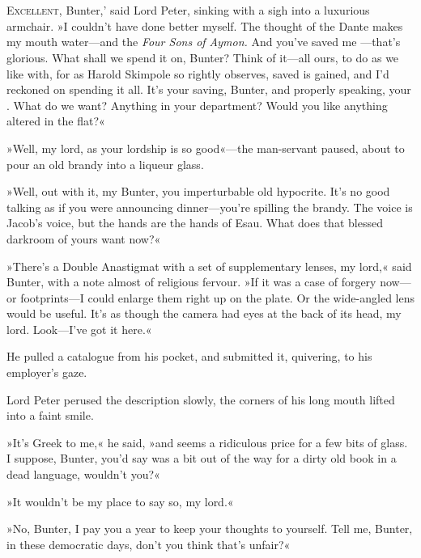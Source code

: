 \chapter[Chapter \thechapter]{}
\lettrine[lines=4,ante=‘]{E}{xcellent}, Bunter,' said Lord Peter, sinking with a sigh into a luxurious armchair. »I couldn't have done better myself. The thought of the Dante makes my mouth water—and the \textit{Four Sons of Aymon.} And you've saved me —that's glorious. What shall we spend it on, Bunter? Think of it—all ours, to do as we like with, for as Harold Skimpole so rightly observes,  saved is  gained, and I'd reckoned on spending it all. It's your saving, Bunter, and properly speaking, your . What do we want? Anything in your department? Would you like anything altered in the flat?«

»Well, my lord, as your lordship is so good«---the man-servant paused, about to pour an old brandy into a liqueur glass.

»Well, out with it, my Bunter, you imperturbable old hypocrite. It's no good talking as if you were announcing dinner—you're spilling the brandy. The voice is Jacob's voice, but the hands are the hands of Esau. What does that blessed darkroom of yours want now?«

»There's a Double Anastigmat with a set of supplementary lenses, my lord,« said Bunter, with a note almost of religious fervour. »If it was a case of forgery now—or footprints—I could enlarge them right up on the plate. Or the wide-angled lens would be useful. It's as though the camera had eyes at the back of its head, my lord. Look—I've got it here.«

He pulled a catalogue from his pocket, and submitted it, quivering, to his employer's gaze.

Lord Peter perused the description slowly, the corners of his long mouth lifted into a faint smile.

»It's Greek to me,« he said, »and  seems a ridiculous price for a few bits of glass. I suppose, Bunter, you'd say  was a bit out of the way for a dirty old book in a dead language, wouldn't you?«

»It wouldn't be my place to say so, my lord.«

»No, Bunter, I pay you  a year to keep your thoughts to yourself. Tell me, Bunter, in these democratic days, don't you think that's unfair?«

